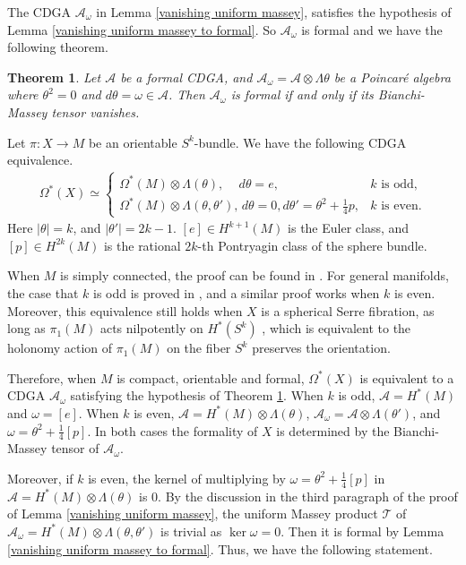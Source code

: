 \documentclass{article}
\theoremstyle{plain}
\newtheorem{thm}{Theorem}[section]
\theoremstyle{definition}
\theoremstyle{plain}
\numberwithin{equation}{section}
\begin{document}
The CDGA $\mathcal{A}_{\omega}$ in Lemma \ref{vanishing uniform massey}, satisfies the hypothesis of Lemma \ref{vanishing uniform massey to formal}. So $\mathcal{A}_{\omega}$ is formal and we have the following theorem.
\begin{thm}\label{B-M tensor to formality}
Let $\mathcal{A}$ be a formal CDGA, and $\mathcal{A}_{\omega}=\mathcal{A}\otimes \Lambda\theta$ be a Poincar\'e algebra where $\theta^2=0$ and $d\theta=\omega\in\mathcal{A}$. Then $\mathcal{A}_\omega$ is formal if and only if its Bianchi-Massey tensor vanishes.
\end{thm}

Let $\pi:X\to M$ be an orientable $S^k$-bundle. We have the following CDGA equivalence.
\begin{align*}
\Omega^*(X)\simeq
\begin{cases}
\Omega^*(M)\otimes\Lambda(\theta), \quad\, d\theta=e, & k\text{ is odd,}\\
\Omega^*(M)\otimes\Lambda(\theta,\theta'), \, d\theta=0, d\theta'=\theta^2+\frac{1}{4}p, & k\text{ is even.}
\end{cases}
\end{align*}
Here $|\theta|=k$, and $|\theta'|=2k-1$. $[e]\in H^{k+1}(M)$ is the Euler class, and $[p]\in H^{2k}(M)$ is the rational $2k$-th Pontryagin class of the sphere bundle.

When $M$ is simply connected, the proof can be found in \cite[Example 4, Page 202]{FHT}. For general manifolds, the case that $k$ is odd is proved in \cite[Appendix]{tt}, and a similar proof works when $k$ is even. Moreover, this equivalence still holds when $X$ is a spherical Serre fibration, as long as $\pi_1(M)$ acts nilpotently on $H^*(S^k)$ \cite[Theorem 20.3]{Halperin}, which is equivalent to the holonomy action of $\pi_1(M)$ on the fiber $S^k$ preserves the orientation.

Therefore, when $M$ is compact, orientable and formal, $\Omega^*(X)$ is equivalent to a CDGA $\mathcal{A}_{\omega}$ satisfying the hypothesis of Theorem \ref{B-M tensor to formality}. When $k$ is odd, $\mathcal{A}=H^*(M)$ and $\omega=[e]$. When $k$ is even, $\mathcal{A}=H^*(M)\otimes\Lambda(\theta)$, $\mathcal{A}_{\omega}=\mathcal{A}\otimes\Lambda(\theta')$, and $\omega=\theta^2+\frac{1}{4}[p]$. In both cases the formality of $X$ is determined by the Bianchi-Massey tensor of $\mathcal{A}_{\omega}$.

Moreover, if $k$ is even, the kernel of multiplying by $\omega=\theta^2+\frac{1}{4}[p]$ in $\mathcal{A}=H^*(M)\otimes\Lambda(\theta)$ is 0. By the discussion in the third paragraph of the proof of Lemma \ref{vanishing uniform massey}, the uniform Massey product $\mathcal{T}$ of $\mathcal{A}_{\omega}=H^*(M)\otimes\Lambda(\theta,\theta')$ is trivial as $\ker\omega=0$. Then it is formal by Lemma \ref{vanishing uniform massey to formal}. Thus, we have the following statement.
\end{document}
